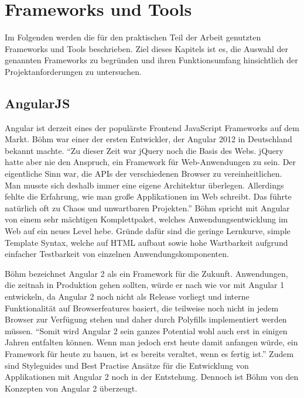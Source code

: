 
\chapter{Frameworks und Tools}
\label{chap:frameworks}

Im Folgenden werden die für den praktischen Teil der Arbeit genutzten Frameworks und Tools beschrieben.
Ziel dieses Kapitels ist es, die Auswahl der genannten Frameworks zu begründen und
ihren Funktionsumfang hinsichtlich der Projektanforderungen zu untersuchen.

\section{AngularJS}

Angular ist derzeit eines der populärste Frontend JavaScript Frameworks auf dem Markt.
Böhm war einer der ersten Entwickler, der Angular 2012 in Deutschland bekannt machte.
``Zu dieser Zeit war jQuery noch die Basis des Webs. jQuery hatte aber nie den Anspruch, ein Framework für Web-Anwendungen zu sein. Der eigentliche Sinn war, die APIs der verschiedenen Browser zu vereinheitlichen.
Man musste sich deshalb immer eine eigene Architektur überlegen. Allerdings fehlte die Erfahrung, wie man große Applikationen im Web schreibt. Das führte natürlich oft zu Chaos und unwartbaren Projekten.''\cite{Angu68:online}
Böhm spricht mit Angular von einem sehr mächtigen Komplettpaket, welches Anwendungsentwicklung im Web auf ein neues Level hebe.
Gründe dafür sind die geringe Lernkurve, simple Template Syntax,
welche auf \ac{HTML} aufbaut sowie hohe Wartbarkeit aufgrund einfacher Testbarkeit von einzelnen Anwendungskomponenten.

Böhm bezeichnet Angular 2 als ein Framework für die Zukunft.
Anwendungen, die zeitnah in Produktion gehen sollten, würde er nach wie vor mit Angular 1 entwickeln,
da Angular 2 noch nicht als Release vorliegt und interne Funktionalität auf Browserfeatures basiert,
die teilweise noch nicht in jedem Browser zur Verfügung stehen und daher durch Polyfills implementiert werden müssen.
``Somit wird Angular 2 sein ganzes Potential wohl auch erst in einigen Jahren entfalten können.
Wenn man jedoch erst heute damit anfangen würde, ein Framework für heute zu bauen,
ist es bereits veraltet, wenn es fertig ist.''\cite{Angu68:online}
Zudem sind Styleguides und Best Practise Ansätze für die Entwicklung von Applikationen mit Angular 2
noch in der Entstehung.
Dennoch ist Böhm von den Konzepten von Angular 2 überzeugt.


